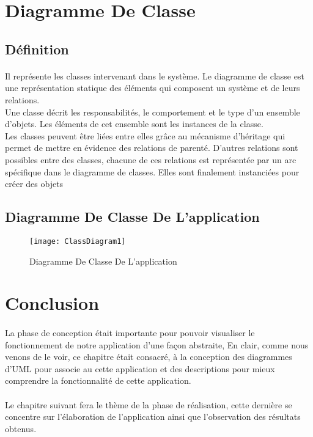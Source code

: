 \documentclass[12pt, openany]{report}
\begin{document}
\section{Diagramme De Classe}
\subsection{Définition}
\raggedright\paragraph{}Il représente les classes intervenant dans le système. Le diagramme de classe est une représentation statique des éléments qui composent un système et de leurs relations.
\\ Une classe décrit les responsabilités, le comportement et le type d'un ensemble d'objets. Les éléments de cet ensemble sont les instances de la classe.
\\ Les classes peuvent être liées entre elles grâce au mécanisme d'héritage qui permet de mettre en évidence des relations de parenté. D'autres relations sont possibles entre des classes, chacune de ces relations est représentée par un arc spécifique dans le diagramme de classes. Elles sont finalement instanciées pour créer des objets
\subsection{Diagramme De Classe De L'application}
\begin{figure}[!h]
	\centering
	\texttt{[image: ClassDiagram1]}
	\caption{Diagramme De Classe De L'application}
	\label{fig:classdiagram1}
\end{figure}
\section{Conclusion}
\paragraph{}
La phase de conception était importante pour pouvoir visualiser le fonctionnement de notre application d'une façon abstraite, En clair, comme nous venons de le voir, ce chapitre était consacré, à la conception des diagrammes d’UML pour associe au cette application et des descriptions pour mieux comprendre la fonctionnalité de cette application.
\paragraph{}Le chapitre suivant fera le thème de la phase de réalisation, cette dernière se concentre sur l’élaboration de l’application ainsi que l’observation des résultats obtenus.
\end{document}
